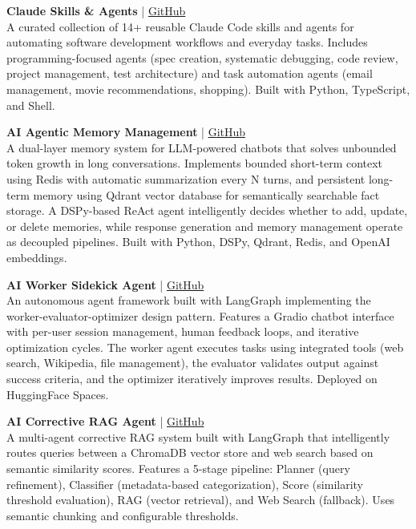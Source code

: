 \documentclass[a4paper,11pt]{article}
\begin{document}
\vspace{6pt}
\textbf{Claude Skills \& Agents} | \href{https://github.com/Vijay2351989/claude-skills-agents}{GitHub} \\
A curated collection of 14+ reusable Claude Code skills and agents for automating software development workflows and everyday tasks. Includes programming-focused agents (spec creation, systematic debugging, code review, project management, test architecture) and task automation agents (email management, movie recommendations, shopping). Built with Python, TypeScript, and Shell.

\vspace{6pt}
\textbf{AI Agentic Memory Management} | \href{https://github.com/Vijay2351989/ai-agentic-memory-management}{GitHub} \\
A dual-layer memory system for LLM-powered chatbots that solves unbounded token growth in long conversations. Implements bounded short-term context using Redis with automatic summarization every N turns, and persistent long-term memory using Qdrant vector database for semantically searchable fact storage. A DSPy-based ReAct agent intelligently decides whether to add, update, or delete memories, while response generation and memory management operate as decoupled pipelines. Built with Python, DSPy, Qdrant, Redis, and OpenAI embeddings.

\vspace{6pt}
\textbf{AI Worker Sidekick Agent} | \href{https://github.com/Vijay2351989/ai-worker-sidekick-agent}{GitHub} \\
An autonomous agent framework built with LangGraph implementing the worker-evaluator-optimizer design pattern. Features a Gradio chatbot interface with per-user session management, human feedback loops, and iterative optimization cycles. The worker agent executes tasks using integrated tools (web search, Wikipedia, file management), the evaluator validates output against success criteria, and the optimizer iteratively improves results. Deployed on HuggingFace Spaces.

\vspace{6pt}
\textbf{AI Corrective RAG Agent} | \href{https://github.com/Vijay2351989/ai-corrective-rag-agent}{GitHub} \\
A multi-agent corrective RAG system built with LangGraph that intelligently routes queries between a ChromaDB vector store and web search based on semantic similarity scores. Features a 5-stage pipeline: Planner (query refinement), Classifier (metadata-based categorization), Score (similarity threshold evaluation), RAG (vector retrieval), and Web Search (fallback). Uses semantic chunking and configurable thresholds.
\end{document}
